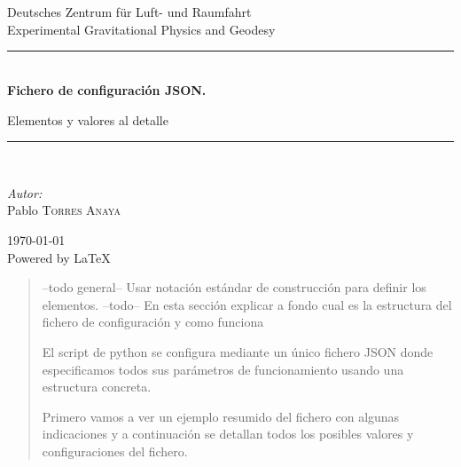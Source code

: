 \documentclass[12pt, a4paper, oneside, titlepage]{article}
\newcommand{\HRule}{\rule{\linewidth}{0.5mm}}
\begin{document}
	
	\begin{titlepage}
		\begin{center}
			\textsc{\LARGE }\\[1.5cm]
			\textsc{\Large }\\[0.5cm]
			Deutsches Zentrum für Luft- und Raumfahrt\\
			Experimental Gravitational Physics and Geodesy \\
			\HRule \\[0.8cm]
			{ \huge \bfseries Fichero de configuración JSON.}\\[0.4cm]
			
\begin{Large}
					Elementos y valores al detalle

			\end{Large}			\HRule \\[1.5cm]
			
			\begin{minipage}{0.4\textwidth}
				\begin{flushleft} \large
					\emph{Autor:}\\
					Pablo \textsc{Torres Anaya}
				\end{flushleft}
			\end{minipage}
			\begin{minipage}{0.4\textwidth}
				\begin{flushright} \large
				\end{flushright}
			\end{minipage}
			\vfill
			{\large \today}\\
			{\normalsize Powered by \LaTeX}
			
		\end{center}
	\end{titlepage}
	\tableofcontents

\begin{abstract}
--todo general-- Usar notación estándar de construcción para definir los elementos.
--todo-- En esta sección explicar a fondo cual es la estructura del fichero de configuración y como funciona

El script de python se configura mediante un único fichero JSON donde especificamos todos sus parámetros de funcionamiento usando una estructura concreta.


Primero vamos a ver un ejemplo resumido del fichero con algunas indicaciones y a continuación se detallan todos los posibles valores y configuraciones del fichero.

\end{abstract}	
\end{document}
